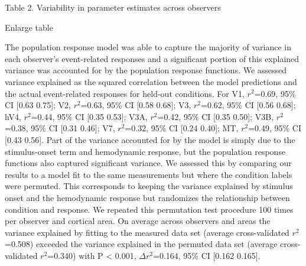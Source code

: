 \documentclass{report}
\begin{document}
Table 2. Variability in parameter estimates across observers

Enlarge table

The population response model was able to capture the majority of variance in each observer’s event-related responses and a significant portion of this explained variance was accounted for by the population response functions. We assessed variance explained as the squared correlation between the model predictions and the actual event-related responses for held-out conditions. For V1, $r^2$=0.69, 95\% CI [0.63 0.75]; V2, $r^2$=0.63, 95\% CI [0.58 0.68]; V3, $r^2$=0.62, 95\% CI [0.56 0.68]; hV4, $r^2$=0.44, 95\% CI [0.35 0.53]; V3A, $r^2$=0.42, 95\% CI [0.35 0.50]; V3B, $r^2$=0.38, 95\% CI [0.31 0.46]; V7, $r^2$=0.32, 95\% CI [0.24 0.40]; MT, $r^2$=0.49, 95\% CI [0.43 0.56]. Part of the variance accounted for by the model is simply due to the stimulus-onset term and hemodynamic response, but the population response functions also captured significant variance. We assessed this by comparing our results to a model fit to the same measurements but where the condition labels were permuted. This corresponds to keeping the variance explained by stimulus onset and the hemodynamic response but randomizes the relationship between condition and response. We repeated this permutation test procedure 100 times per observer and cortical area. On average across observers and areas the variance explained by fitting to the measured data set (average cross-validated $r^2$=0.508) exceeded the variance explained in the permuted data set (average cross-validated $r^2$=0.340) with P < 0.001, $\Delta r^2$=0.164, 95\% CI [0.162 0.165].
\end{document}
